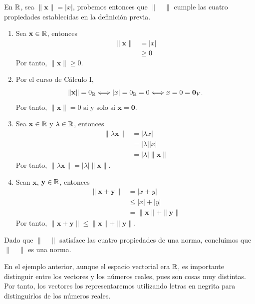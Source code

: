 \begin{example}
    En $\RR$, sea $\| \mathbf{x} \| = |x|$, probemos entonces que $\| \quad \|$ cumple las cuatro propiedades establecidas en la definición previa.
    \begin{enumerate}[label=\roman*.]
        \item Sea $\mathbf{x} \in \RR$, entonces
        \begin{align*}
            \| \mathbf{x} \| & = |x| \\
            & \geq 0 
        \end{align*}
        Por tanto, $\| \mathbf{x} \| \geq 0$.
        \item Por el curso de Cálculo I,
        $$\| \mathbf{x} \| = 0_{\RR} \Longleftrightarrow |x| = 0_{\RR} = 0 \Longleftrightarrow x = 0 = \mathbf{0}_V.$$
        Por tanto, $\| \mathbf{x} \| = 0$ si y solo si $\mathbf{x} = \mathbf{0}$.
        \item Sea $\mathbf{x} \in \RR$ y $\lambda \in \RR$, entonces
        \begin{align*}
            \| \lambda \mathbf{x} \| & = |\lambda x| \\
            & = |\lambda| |x| \\
            & = |\lambda| \| \mathbf{x} \| 
        \end{align*}
        Por tanto, $\| \lambda \mathbf{x} \| = |\lambda| \| \mathbf{x} \|$.
        \item Sean $\mathbf{x}$, $\mathbf{y} \in \RR$, entonces
        \begin{align*}
            \| \mathbf{x} + \mathbf{y} \| & = |x + y| \\
            & \leq |x| + |y| \\
            & = \| \mathbf{x} \| + \| \mathbf{y} \|
        \end{align*}
        Por tanto, $\| \mathbf{x} + \mathbf{y} \| \leq \| \mathbf{x} \| + \| \mathbf{y} \|$.
    \end{enumerate}
    Dado que $\| \quad \|$ satisface las cuatro propiedades de una norma, concluimos que  $\| \quad \|$ es una norma.
\end{example}

\begin{observation}
    En el ejemplo anterior, aunque el espacio vectorial era $\RR$, es importante distinguir entre los vectores y los números reales, pues son cosas muy distintas. Por tanto, los vectores los representaremos utilizando letras en negrita para distinguirlos de los números reales.
\end{observation}

